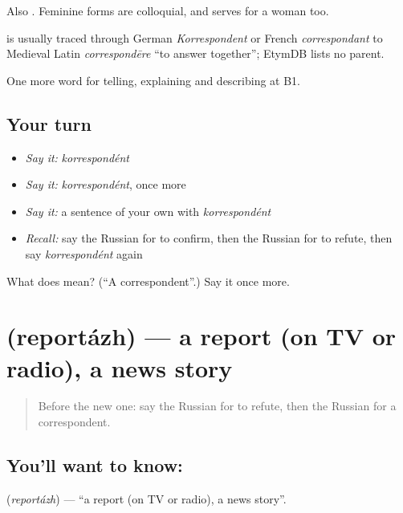 Also \emph{}. Feminine forms are colloquial, and \emph{} serves for a woman too.

\begin{cousinweb}
\emph{} is usually traced through German \emph{Korrespondent} or French \emph{correspondant} to Medieval Latin \emph{correspondēre} \textquotedblleft{}to answer together\textquotedblright{}; EtymDB lists no parent.
\end{cousinweb}

\begin{grammarlens}[title={What you've built}]
One more word for telling, explaining and describing at B1.
\end{grammarlens}

\subsection*{Your turn}
\begin{itemize}
\raggedright
  \item \emph{Say it:} \emph{korrespondént}
  \item \emph{Say it:} \emph{korrespondént}, once more
  \item \emph{Say it:} a sentence of your own with \emph{korrespondént}
  \item \emph{Recall:} say the Russian for to confirm, then the Russian for to refute, then say \emph{korrespondént} again
\end{itemize}

\begin{tcolorbox}[breakable,colback=teal!4,colframe=teal!35!black,title={Before you move on}]
What does  mean? (\textquotedblleft{}A correspondent\textquotedblright{}.) Say it once more.
\end{tcolorbox}
\section[\texorpdfstring{\ru{репортаж} (reportázh)}{репортаж (reportázh)}]{ (reportázh) — a report (on TV or radio), a news story}

\label{lesson:RU-C281-reportazh}



\begin{quote}
Before the new one: say the Russian for to refute, then the Russian for a correspondent.
\end{quote}

\subsection*{You'll want to know: }
\textbf{} (\emph{reportázh}) — \textquotedblleft{}a report (on TV or radio), a news story\textquotedblright{}.

